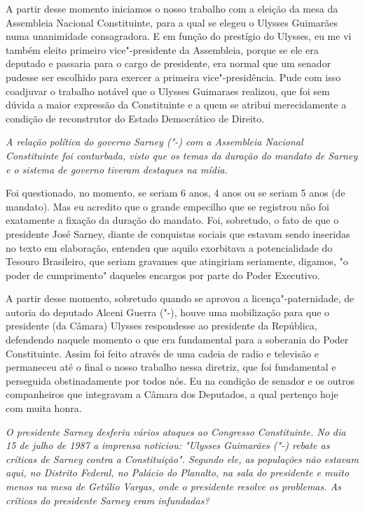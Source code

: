 A partir desse momento iniciamos o nosso trabalho com a eleição da mesa
da Assembleia Nacional Constituinte, para a qual se elegeu o Ulysses
Guimarães numa unanimidade consagradora. E em função do prestígio do
Ulysses, eu me vi também eleito primeiro vice"-presidente da Assembleia,
porque se ele era deputado e passaria para o cargo de presidente, era
normal que um senador pudesse ser escolhido para exercer a primeira
vice"-presidência. Pude com isso coadjuvar o trabalho notável que o
Ulysses Guimaraes realizou, que foi sem dúvida a maior expressão da
Constituinte e a quem se atribui merecidamente a condição de
reconstrutor do Estado Democrático de Direito.

\medskip

\noindent\emph{A relação política do governo Sarney ("-) com a Assembleia
Nacional Constituinte foi conturbada, visto que os temas da duração do
mandato de Sarney e o sistema de governo tiveram destaques na mídia.}

Foi questionado, no momento, se seriam 6 anos, 4
anos ou se seriam 5 anos (de mandato). Mas eu acredito que o grande
empecilho que se registrou não foi exatamente a fixação da duração do
mandato. Foi, sobretudo, o fato de que o presidente José Sarney, diante
de conquistas sociais que estavam sendo inseridas no texto em
elaboração, entendeu que aquilo exorbitava a potencialidade do Tesouro
Brasileiro, que seriam gravames que atingiriam seriamente, digamos, "o
poder de cumprimento" daqueles encargos por parte do Poder Executivo.

A partir desse momento, sobretudo quando se aprovou a
licença"-paternidade, de autoria do deputado Alceni Guerra ("-),
houve uma mobilização para que o presidente (da Câmara) Ulysses
respondesse ao presidente da República, defendendo naquele momento o que
era fundamental para a soberania do Poder Constituinte. Assim foi feito
através de uma cadeia de radio e televisão e permaneceu até o final o
nosso trabalho nessa diretriz, que foi fundamental e perseguida
obstinadamente por todos nós. Eu na condição de senador e os outros
companheiros que integravam a Câmara dos Deputados, a qual pertenço hoje
com muita honra.

\medskip

\noindent\emph{O presidente Sarney desferiu vários ataques ao Congresso
Constituinte. No dia 15 de julho de 1987 a imprensa noticiou: "Ulysses
Guimarães ("-) rebate as críticas de Sarney contra a Constituição".
Segundo ele, as populações não estavam aqui, no Distrito Federal, no
Palácio do Planalto, na sala do presidente e muito menos na mesa de
Getúlio Vargas, onde o presidente resolve os problemas. As críticas do
presidente Sarney eram infundadas?}

